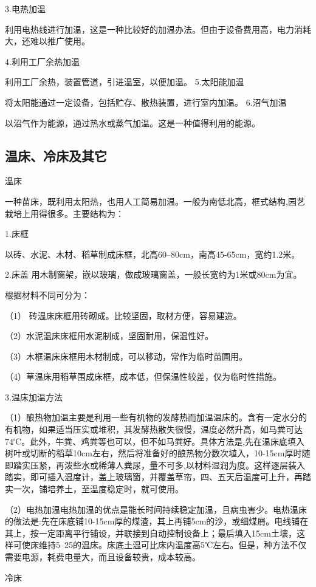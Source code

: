 \documentclass{ctexbook}
\begin{document}
3.电热加温

利用电热线进行加温，这是一种比较好的加温办法。但由于设备费用高，电力消耗大，还难以推广使用。

4.利用工厂余热加温

利用工厂余热，装置管道，引进温室，以便加温。
5.太阳能加温

将太阳能通过一定设备，包括贮存、散热装置，进行室内加温。
6.沼气加温

以沼气作为能源，通过热水或蒸气加温。这是一种值得利用的能源。
\subsection{温床、冷床及其它}
温床

一种苗床，既利用太阳热，也用人工简易加温。一般为南低北高，框式结构,园艺栽培上用得很多。主要结构为：

1.床框

以砖、水泥、木材、稻草制成床框，北高60--80cm，南高45-65cm，宽约1.2米。

2.床盖
用木制窗架，嵌以玻璃，做成玻璃窗盖，一般长宽约为1米或80cm为宜。

根据材料不同可分为：

（1）	砖温床床框用砖砌成。比较坚固，取材方便，容易建造。

（2）水泥温床床框用水泥制成，坚固耐用，保温性好。

（3）木框温床床框用木材制成，可以移动，常作为临时苗圃用。

（4）草温床用稻草围成床框，成本低，但保温性较差，仅为临时性措施。

3.温床加温方法

（1）酿热物加温主要是利用一些有机物的发酵热而加温温床的。含有一定水分的有机物，如果适当压实或堆积，其发酵热散失很慢，温度必然升高，如马粪可达74℃。此外，牛粪、鸡粪等也可以，但不如马粪好。具体方法是,先在温床底填入树叶或切断的稻草10cm左右，然后将准备好的酿热物分数次埴入，10-15cm厚时随即踏实压紧，再泼些水或稀薄人粪尿，量不可多,以材料湿润为度。这样逐层装入踏实，即可插入温度计，盖上玻璃窗，并覆盖草帘，四、五天后温度可上升，再踏实一次，铺培养土，至温度稳定时，就可使用。

（2）电热加温电热加温的优点是能长时间持续稳定加温，且病虫害少。电热温床的做法是:先在床底铺10-15cm厚的煤渣，其上再铺5cm的沙，或细煤屑。电线铺在其上，按一定距离平行铺设，并联接到自动控制设备上；最后填入15cm土壤，这样可使床维持5--25的温床。床底土温可比床内温度高5℃左右。但是，种方法不仅需要电源，耗费电量大，而且设备较贵，成本较高。

冷床
\end{document}
